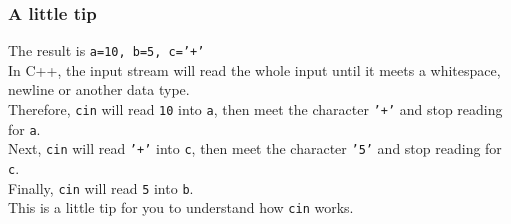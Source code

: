 \documentclass[xcolor=dvipsnames]{beamer}
\begin{document}
    \begin{frame}
        \frametitle{A little tip}
        The result is \texttt{a=10, b=5, c='+'}\\
        In C++, the input stream will read the whole input until it meets a whitespace, newline or another data type.\\
        Therefore, \texttt{cin} will read \texttt{10} into \texttt{a}, then meet the character \texttt{'+'} and stop reading for \texttt{a}.\\
        Next, \texttt{cin} will read \texttt{'+'} into \texttt{c}, then meet the character \texttt{'5'} and stop reading for \texttt{c}.\\
        Finally, \texttt{cin} will read \texttt{5} into \texttt{b}.\\
        This is a little tip for you to understand how \texttt{cin} works.
    \end{frame}
\end{document}
